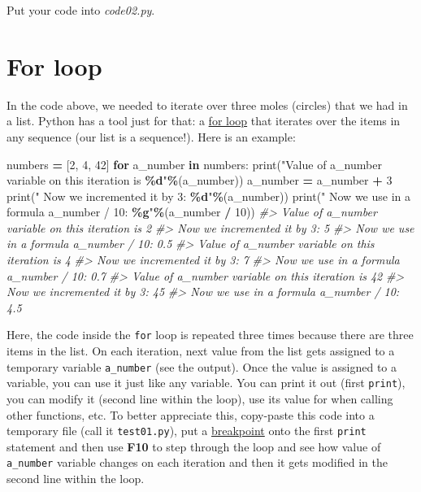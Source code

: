 \documentclass[
]{book}
\newenvironment{Shaded}{\begin{snugshade}}{\end{snugshade}}
\newcommand{\BuiltInTok}[1]{#1}
\newcommand{\CommentTok}[1]{\textcolor[rgb]{0.56,0.35,0.01}{\textit{#1}}}
\newcommand{\ControlFlowTok}[1]{\textcolor[rgb]{0.13,0.29,0.53}{\textbf{#1}}}
\newcommand{\DecValTok}[1]{\textcolor[rgb]{0.00,0.00,0.81}{#1}}
\newcommand{\KeywordTok}[1]{\textcolor[rgb]{0.13,0.29,0.53}{\textbf{#1}}}
\newcommand{\NormalTok}[1]{#1}
\newcommand{\OperatorTok}[1]{\textcolor[rgb]{0.81,0.36,0.00}{\textbf{#1}}}
\newcommand{\SpecialCharTok}[1]{\textcolor[rgb]{0.81,0.36,0.00}{\textbf{#1}}}
\newcommand{\StringTok}[1]{\textcolor[rgb]{0.31,0.60,0.02}{#1}}
\begin{document}
Put your code into \emph{code02.py}.

\hypertarget{for-loop}{%
\section{For loop}\label{for-loop}}

In the code above, we needed to iterate over three moles (circles) that we had in a list. Python has a tool just for that: a
\href{https://docs.python.org/3/tutorial/controlflow.html?highlight=loop\#for-statements}{for loop} that iterates over the items in any sequence (our list is a sequence!). Here is an example:

\begin{Shaded}
\begin{Highlighting}[]
\NormalTok{numbers }\OperatorTok{=}\NormalTok{ [}\DecValTok{2}\NormalTok{, }\DecValTok{4}\NormalTok{, }\DecValTok{42}\NormalTok{]}
\ControlFlowTok{for}\NormalTok{ a\_number }\KeywordTok{in}\NormalTok{ numbers:}
    \BuiltInTok{print}\NormalTok{(}\StringTok{"Value of a\_number variable on this iteration is }\SpecialCharTok{\%d}\StringTok{"}\OperatorTok{\%}\NormalTok{(a\_number))}
\NormalTok{    a\_number }\OperatorTok{=}\NormalTok{ a\_number }\OperatorTok{+} \DecValTok{3}
    \BuiltInTok{print}\NormalTok{(}\StringTok{"  Now we incremented it by 3: }\SpecialCharTok{\%d}\StringTok{"}\OperatorTok{\%}\NormalTok{(a\_number))}
    \BuiltInTok{print}\NormalTok{(}\StringTok{"  Now we use in a formula a\_number / 10: }\SpecialCharTok{\%g}\StringTok{"}\OperatorTok{\%}\NormalTok{(a\_number }\OperatorTok{/} \DecValTok{10}\NormalTok{))}
\CommentTok{\#\textgreater{} Value of a\_number variable on this iteration is 2}
\CommentTok{\#\textgreater{}   Now we incremented it by 3: 5}
\CommentTok{\#\textgreater{}   Now we use in a formula a\_number / 10: 0.5}
\CommentTok{\#\textgreater{} Value of a\_number variable on this iteration is 4}
\CommentTok{\#\textgreater{}   Now we incremented it by 3: 7}
\CommentTok{\#\textgreater{}   Now we use in a formula a\_number / 10: 0.7}
\CommentTok{\#\textgreater{} Value of a\_number variable on this iteration is 42}
\CommentTok{\#\textgreater{}   Now we incremented it by 3: 45}
\CommentTok{\#\textgreater{}   Now we use in a formula a\_number / 10: 4.5}
\end{Highlighting}
\end{Shaded}

Here, the code inside the \texttt{for} loop is repeated three times because there are three items in the list. On each iteration, next value from the list gets assigned to a temporary variable \texttt{a\_number} (see the output). Once the value is assigned to a variable, you can use it just like any variable. You can print it out (first \texttt{print}), you can modify it (second line within the loop), use its value for when calling other functions, etc. To better appreciate this, copy-paste this code into a temporary file (call it \texttt{test01.py}), put a \protect\hyperlink{debugging}{breakpoint} onto the first \texttt{print} statement and then use \textbf{F10} to step through the loop and see how value of \texttt{a\_number} variable changes on each iteration and then it gets modified in the second line within the loop.
\end{document}
